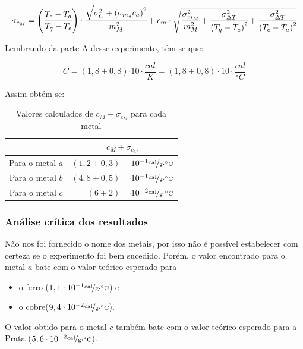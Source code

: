 \documentclass[a4paper]{article}
\providecommand{\tabularnewline}{\\}
\begin{document}
				\begin{equation}
					\sigma_{c_{M}}=
						\left(\cfrac{T_{e}-T_{a}}{T_{q}-T_{e}}\right)\cdot\cfrac{\sqrt{\sigma_{C}^{2}+
						\left(\sigma_{m_{a}}c_{a}\right)^{2}}}{m_{M}^{2}}+c_{m}\cdot\sqrt{\cfrac{\sigma_{m_{M}}^{2}}{m_{M}^{2}}+\cfrac{\sigma_{\Delta T}^{2}}{
						\left(T_{q}-T_{e}\right)^{2}}+\cfrac{\sigma_{\Delta T}^{2}}{
						\left(T_{e}-T_{a}\right)^{2}}}
				\end{equation}


				Lembrando da parte A desse experimento, têm-se que:

				\begin{equation}
					C=\left(1,8\pm0,8\right)\unit{\cdot10\cdot\frac{cal}{K}=\left(1,8\pm0,8\right)\cdot10\cdot}\frac{cal}{^{\circ}C}
				\end{equation}


				Assim obtém-se:

				\begin{table}[!ht]
					\caption{Valores calculados de $c_{M}\pm\sigma_{c_{M}}$ para cada metal}


					\centering{}%
					\begin{tabular}{|c|rl|}
						\cline{2-3} 
						\multicolumn{1}{c|}{} & \multicolumn{2}{c|}{$c_{M}\pm\sigma_{c_{M}}$}\tabularnewline
						\hline 
						Para o metal $a$  & $\left(1,2\pm0,3\right)$  & 
						$\cdot10^{-1}\unitfrac{cal}{g\cdot^{\circ}C}$\tabularnewline
						\hline 
						Para o metal $b$  & $\left(4,8\pm0,5\right)$  & 
						$\cdot10^{-1}\unitfrac{cal}{g\cdot^{\circ}C}$\tabularnewline
						\hline 
						Para o metal $c$  & $\left(6\pm2\right)$  & 
						$\cdot10^{-2}\unitfrac{cal}{g\cdot^{\circ}C}$\tabularnewline
						\hline 
					\end{tabular}
				\end{table}

			\subsubsection{Análise crítica dos resultados}

				Não nos foi fornecido o nome dos metais, por isso não é possível estabelecer
				com certeza se o experimento foi bem sucedido. Porém, o valor encontrado
				para o metal $a$ bate com o valor teórico esperado para 
				\begin{itemize}
					\item o ferro ($1,1\cdot10^{-1}\unitfrac{cal}{g\cdot^{\circ}C}$) e 
					\item o cobre($9,4\cdot10^{-2}\unitfrac{cal}{g\cdot^{\circ}C}$). 
				\end{itemize}
				O valor obtido para o metal $c$ também bate com o valor teórico esperado
				para a Prata ($5,6\cdot10^{-2}\unitfrac{cal}{g\cdot^{\circ}C}$).
\end{document}
